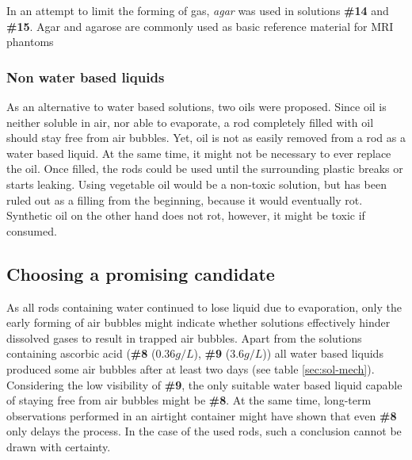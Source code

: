 In an attempt to limit the forming of gas, \textit{agar} was used in solutions \textbf{\#14} and \textbf{\#15}.
Agar and agarose are commonly used as basic reference material for MRI phantoms \cite{Bucciolini1989, Mathur-DeVre1985}

\subsubsection{Non water based liquids}
As an alternative to water based solutions, two oils were proposed.
Since oil is neither soluble in air, nor able to evaporate, a rod completely filled with oil should stay free from air bubbles.
Yet, oil is not as easily removed from a rod as a water based liquid.
At the same time, it might not be necessary to ever replace the oil.
Once filled, the rods could be used until the surrounding plastic breaks or starts leaking.
Using vegetable oil would be a non-toxic solution, but has been ruled out as a filling from the beginning, because it would eventually rot.
Synthetic oil on the other hand does not rot, however, it might be toxic if consumed.


\subsection{Choosing a promising candidate}
As all rods containing water continued to lose liquid due to evaporation, only the early forming of air bubbles might indicate whether solutions effectively hinder dissolved gases to result in trapped air bubbles.
Apart from the solutions containing ascorbic acid (\textbf{\#8} ($0.36 g/L$), \textbf{\#9} ($3.6 g/L$)) all water based liquids produced some air bubbles after at least two days (see table \ref{sec:sol-mech}).
Considering the low visibility of \textbf{\#9}, the only suitable water based liquid capable of staying free from air bubbles might be \textbf{\#8}.
At the same time, long-term observations performed in an airtight container might have shown that even \textbf{\#8} only delays the process.
In the case of the used rods, such a conclusion cannot be drawn with certainty.

